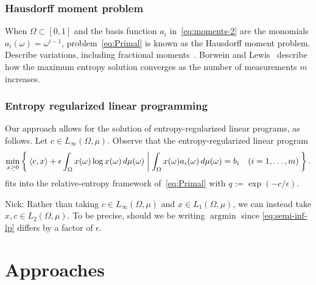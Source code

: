 \documentclass[10pt,a4paper]{article}
\numberwithin{equation}{section}
\theoremstyle{definition}
\newcommand{\nb}[1]{{\color{teal} Nick: #1}}
\newcommand{\ip}[1]{\langle#1\rangle}
\DeclareMathOperator{\argmin}{argmin}
\begin{document}
\subsubsection{Hausdorff moment problem}

When $\Omega\subset[0,1]$ and the basis function $a_i$ in~\eqref{eq:moments-2} are the monomials $a_i(\omega)=\omega^{i-1}$, problem~\eqref{eq:Primal} is known as the Hausdorff moment problem. Describe variations, including fractional moments~\cite{gzyl_HausdorffMomentProblem_2010}. Borwein and Lewis~\cite{borwein_ConvergenceBestEntropy_1991} describe how the maximum entropy solution converges as the number of measurements $m$ increases.

\subsubsection{Entropy regularized linear programming}

Our approach allows for the solution of entropy-regularized linear programs, as follows. 
Let $c\in L_\infty(\Omega,\mu)$. Observe that the entropy-regularized linear program
\begin{equation}\label{eq:semi-inf-lp}
    \min_{x\ge0} \Set{ \ip{c,x} + \epsilon \int_\Omega x(\omega) \log x(\omega) \,d\mu(\omega) | \int_\Omega x(\omega)a_i(\omega)\,d\mu(\omega) = b_i \quad (i=1,\dots,m) }.
\end{equation}
fits into the relative-entropy framework of~\eqref{eq:Primal} with $q:=\exp(-c/\epsilon)$.

\nb{Rather than taking $c\in L_\infty(\Omega,\mu)$ and $x \in  L_1(\Omega,\mu)$, we can instead take  $x, c \in L_2(\Omega,\mu)$. To be precise, should we be writing $\argmin$ since \eqref{eq:semi-inf-lp} differs by a factor of $\epsilon$.}

\section{Approaches}
\end{document}
